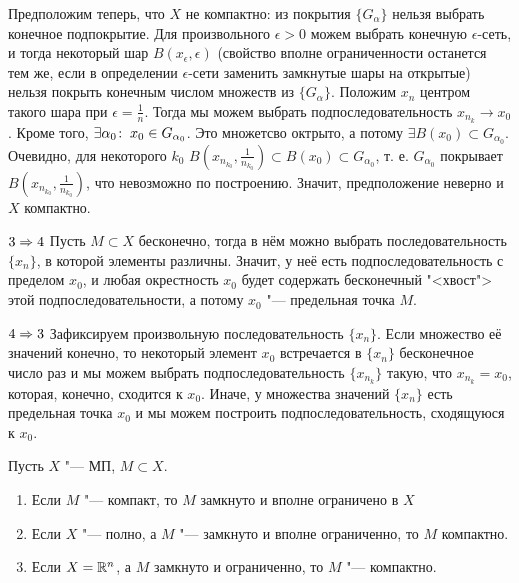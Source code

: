 \documentclass[main]{subfiles}
\begin{document}
\begin{itemproof}
  Предположим теперь, что \( X \) не компактно:
  из покрытия \( \{ G_\alpha \} \) нельзя выбрать конечное
  подпокрытие. Для произвольного \( \epsilon > 0 \)
  можем выбрать конечную \( \epsilon \)-сеть,
  и тогда некоторый шар \( B(x_\epsilon, \epsilon) \)
  (свойство вполне ограниченности останется тем же,
  если в определении \( \epsilon \)-сети заменить
  замкнутые шары на открытые)
  нельзя покрыть конечным числом множеств из \( \{ G_\alpha \} \).
  Положим \( x_n \) центром такого шара при \( \epsilon = \frac{1}{n} \).
  Тогда мы можем выбрать подпоследовательность
  \( x_{n_k} \to x_0 \). Кроме того, \( \exists \alpha_0 \colon \: x_0 \in G_{\alpha_0} \).
  Это множетсво октрыто, а потому \( \exists B(x_0) \subset G_{\alpha_0} \).
  Очевидно, для некоторого \( k_0 \)
  \( B(x_{n_{k_0}}, \frac{1}{n_{k_0}}) \subset B(x_0)
  \subset G_{\alpha_0} \),
  т. е. \( G_{\alpha_0} \) покрывает
  \( B(x_{n_{k_0}}, \frac{1}{n_{k_0}}) \), что невозможно по построению.
  Значит, предположение неверно и \( X \) компактно.
\item[$3 \Rightarrow 4$]
  Пусть \( M \subset X \) бесконечно, тогда
  в нём можно выбрать последовательность
  \( \{ x_n \} \), в которой элементы различны.
  Значит, у неё есть подпоследовательность с пределом
  \( x_0 \), и любая окрестность \( x_0 \) будет
  содержать бесконечный "<хвост"> этой подпоследовательности,
  а потому \( x_0 \) "--- предельная точка \( M \).
\item[$4 \Rightarrow 3$]
  Зафиксируем произвольную последовательность \( \{ x_n \} \).
  Если множество её значений конечно, то некоторый
  элемент \( x_0 \) встречается в \( \{ x_n \} \)
  бесконечное число раз и мы можем выбрать
  подпоследовательность \( \{ x_{n_k} \} \)
  такую, что \( x_{n_k} = x_0 \),
  которая, конечно, сходится к \( x_0 \).
  Иначе, у множества значений \( \{ x_n \} \)
  есть предельная точка \( x_0 \)
  и мы можем построить подпоследовательность,
  сходящуюся к \( x_0 \).
\end{itemproof}

\begin{corollary}
  Пусть \( X \) "--- МП, \( M \subset X \).
  \begin{enumerate}
    \item Если \( M \) "--- компакт,
      то \( M \) замкнуто и вполне ограничено в \( X \)
    \item Если \( X \) "--- полно, а \( M \) "---
      замкнуто и вполне ограниченно, то \( M \) компактно.
    \item Если \( X = \mathbb{R}^n \), а \( M \)
      замкнуто и ограниченно, то \( M \) "--- компактно.
  \end{enumerate}
\end{corollary}
\end{document}

